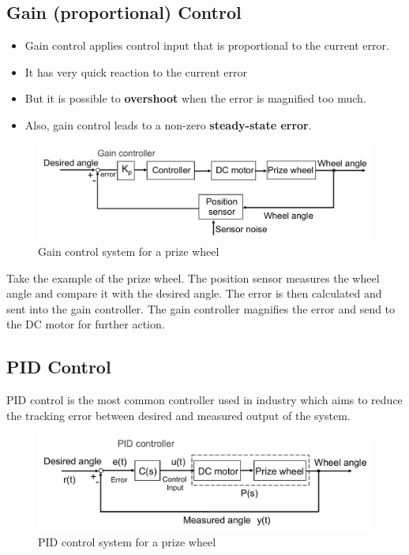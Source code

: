 \documentclass[12pt,a4paper]{article}
\begin{document}
\subsection{Gain (proportional) Control}
\begin{itemize}
\item Gain control applies control input that is proportional to the current error.
\item It has very quick reaction to the current error
\item But it is possible to \textbf{overshoot} when the error is magnified too much.
\item Also, gain control leads to a non-zero \textbf{steady-state error}.
\end{itemize}

\begin{figure}[H] \centering 
\includegraphics[width=.7\textwidth]{images/gain.pdf}
\caption{Gain control system for a prize wheel}
\end{figure}

Take the example of the prize wheel. The position sensor measures the wheel angle and compare it with the desired angle. The error is then calculated and sent into the gain controller. The gain controller magnifies the error and send to the DC motor for further action. 

\subsection{PID Control}%

PID control is the most common controller used in industry which aims to reduce the tracking error between desired and measured output of the system.

\begin{figure}[H] \centering 
\includegraphics[width=.9\textwidth]{images/PID_control.pdf}
\caption{PID control system for a prize wheel}
\end{figure}
\end{document}
